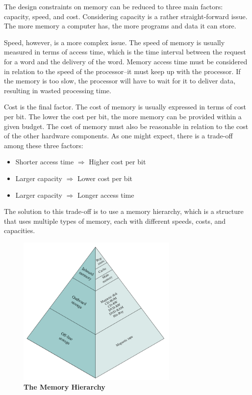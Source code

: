 \documentclass{article}
\begin{document}
The design constraints on memory can be reduced to three main factors: capacity, speed, and cost.
Considering capacity is a rather straight-forward issue. The more memory a computer has, the more programs and data it can store.

Speed, however, is a more complex issue. The speed of memory is usually measured in terms of access time, which is the time interval between the request for a word and the delivery of the word.
Memory access time must be considered in relation to the speed of the processor--it must keep up with the processor. If the memory is too slow, the processor will have to wait for it to deliver data, resulting in wasted processing time.

Cost is the final factor. The cost of memory is usually expressed in terms of cost per bit. The lower the cost per bit, the more memory can be provided within a given budget. The cost of memory must also be reasonable in relation to the cost of the other hardware components.
\newpage
As one might expect, there is a trade-off among these three factors:
\begin{itemize}
    \item Shorter access time $\Rightarrow$ Higher cost per bit
    \item Larger capacity $\Rightarrow$ Lower cost per bit
    \item Larger capacity $\Rightarrow$ Longer access time
\end{itemize}

The solution to this trade-off is to use a memory hierarchy, which is a structure that uses multiple types of memory, each with different speeds, costs, and capacities.

\begin{figure}[!h]
    \centering
    \includegraphics[width=0.7\textwidth]{figures/Ch01Figure7.png} %
    \caption{\textbf{The Memory Hierarchy}}
    \label{fig:Ch01Fig7}
\end{figure}
\end{document}

